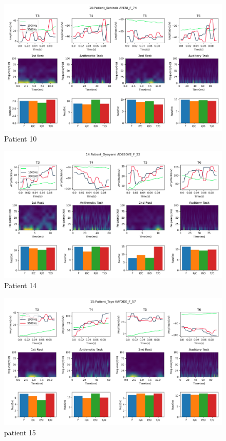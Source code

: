 \documentclass[conference]{IEEEconf}
\begin{document}
\clearpage
\begin{figure}
  \includegraphics[width=\textwidth]{../../data_analysis_results/results/Patient/10.png}
  \caption{Patient 10}
  \label{fig:patient_10}
\end{figure}
\clearpage
\begin{figure}
  \includegraphics[width=\textwidth]{../../data_analysis_results/results/Patient/14.png}
  \caption{Patient 14}
  \label{fig:patient_14}
\end{figure}
\clearpage
\begin{figure}
  \includegraphics[width=\textwidth]{../../data_analysis_results/results/Patient/15.png}
  \caption{patient 15}
  \label{fig:patient_15}
\end{figure}
\end{document}
